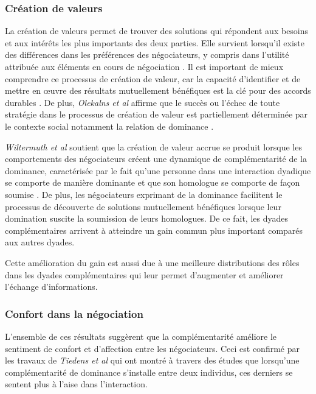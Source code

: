	
		\subsubsection*{Création de valeurs}
		
	La création de valeurs permet de trouver des solutions qui répondent aux besoins et aux intérêts les plus importants des deux parties. Elle survient lorsqu'il existe des différences dans les préférences des négociateurs, y compris dans l'utilité attribuée  aux éléments en cours de négociation \cite{lax1986managerial}. 
	Il est important de mieux comprendre ce processus de création de valeur, car la capacité d'identifier et de mettre en œuvre des résultats mutuellement bénéfiques est la clé pour des accords durables \cite{wiltermuth2015benefits}.
	De plus, \emph{Olekalns et al} affirme que le succès ou l'échec de toute stratégie dans le processus de création de valeur est partiellement déterminée par le contexte social notamment la relation de dominance \cite{olekalns2013dyadic}.
	
	\emph{Wiltermuth et al} soutient que la création de valeur accrue se produit lorsque les comportements des négociateurs créent une dynamique de complémentarité de la dominance, caractérisée par le fait qu'une personne dans une interaction dyadique se comporte de manière dominante et que son homologue se comporte de façon soumise \cite{wiltermuth2015benefits}. De plus, les négociateurs exprimant de la dominance facilitent le processus de découverte de solutions mutuellement bénéfiques lorsque leur domination suscite la soumission de leurs homologues. De ce fait, les dyades complémentaires arrivent à atteindre un gain commun plus important comparés aux autres dyades.
	
	Cette amélioration du gain est aussi due à une meilleure distributions des rôles dans les dyades complémentaires qui leur permet d'augmenter et améliorer l'échange d'informations. 
		\subsubsection*{Confort dans la négociation}
	L'ensemble de ces résultats suggèrent que la complémentarité améliore le sentiment de confort et d'affection entre les négociateurs. Ceci est confirmé par les travaux de \emph{Tiedens et al} \cite{tiedens2003power} qui ont montré à travers des études que lorsqu'une complémentarité de dominance s'installe entre deux individus, ces derniers se sentent plus à l'aise dans l'interaction. 
	
